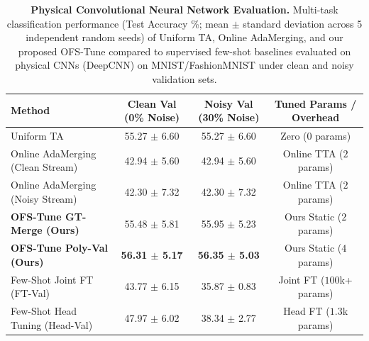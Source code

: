 \begin{table}[htbp]
\caption{\textbf{Physical Convolutional Neural Network Evaluation.} Multi-task classification performance (Test Accuracy \%; mean $\pm$ standard deviation across 5 independent random seeds) of Uniform TA, Online AdaMerging, and our proposed OFS-Tune compared to supervised few-shot baselines evaluated on physical CNNs (DeepCNN) on MNIST/FashionMNIST under clean and noisy validation sets.}
\label{tab:physical_results}
\vskip 0.1in
\begin{center}
\begin{small}
\begin{sc}
\setlength{\tabcolsep}{6.0pt}
\begin{tabular}{lccc}
\toprule
Method & Clean Val (0\% Noise) & Noisy Val (30\% Noise) & Tuned Params / Overhead \\
\midrule
Uniform TA & 55.27 $\pm$ 6.60 & 55.27 $\pm$ 6.60 & Zero ($0$ params) \\
Online AdaMerging (Clean Stream) & 42.94 $\pm$ 5.60 & 42.94 $\pm$ 5.60 & Online TTA ($2$ params) \\
Online AdaMerging (Noisy Stream) & 42.30 $\pm$ 7.32 & 42.30 $\pm$ 7.32 & Online TTA ($2$ params) \\
\midrule
\textbf{OFS-Tune GT-Merge (Ours)} & 55.48 $\pm$ 5.81 & 55.95 $\pm$ 5.23 & Ours Static ($2$ params) \\
\textbf{OFS-Tune Poly-Val (Ours)} & \textbf{56.31 $\pm$ 5.17} & \textbf{56.35 $\pm$ 5.03} & Ours Static ($4$ params) \\
Few-Shot Joint FT (FT-Val) & 43.77 $\pm$ 6.15 & 35.87 $\pm$ 0.83 & Joint FT ($100$k+ params) \\
Few-Shot Head Tuning (Head-Val) & 47.97 $\pm$ 6.02 & 38.34 $\pm$ 2.77 & Head FT ($1.3$k params) \\
\bottomrule
\end{tabular}
\end{sc}
\end{small}
\end{center}
\vskip -0.1in
\end{table}

